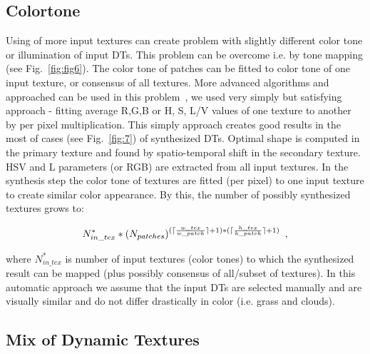 \documentclass{\adsty/acmsiggraph}
\begin{document}
\subsection{Colortone}

Using of more input textures can create problem with slightly different color tone or illumination of input DTs. 
This problem can be overcome i.e. by tone mapping (see Fig.~\ref{fig:fig6}). 
The color tone of patches can be fitted to color tone of one input texture, or consensus of all textures. 
More advanced algorithms and approached can be used in this problem~\cite{Gui02ColurCorrection}, we used very simply but satisfying approach - fitting average R,G,B or H, S, L/V values of one texture to another by per pixel multiplication. 
This simply approach creates good results in the most of cases (see Fig.~\ref{fig:7}) of synthesized DTs.  
Optimal shape is computed in the primary texture and found by spatio-temporal shift in the secondary texture. 
HSV and L parameters (or RGB) are extracted from all input textures. 
In the synthesis step the color tone of textures are fitted (per pixel) to one input texture to create similar color appearance.  
By this, the number of possibly synthesized textures grows to:

\begin{equation} \label{eq:num_syn2}
		N_{in\_tex}^* * ( N_{patches} ) ^ { (\lceil {w\_tex \over w\_patch} \rceil + 1 ) * ( \lceil {h\_tex \over h\_patch} \rceil + 1 )   } \enspace ,
\end{equation}

where $N_{in\_tex}^*$ is number of input textures (color tones) to which the synthesized result can be mapped (plus possibly consensus of all/subset of textures). In this automatic approach we assume that the input DTs are selected manually and are visually  similar and do not differ drastically in color (i.e. grass and clouds).

\subsection{Mix of Dynamic Textures}
\end{document}
